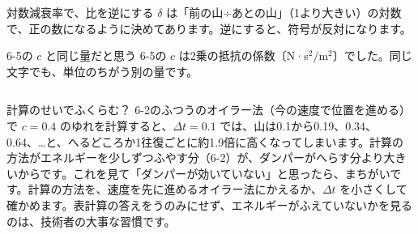 \begin{tsumazuki}{対数減衰率で、比を逆にする}
$\delta$ は「前の山÷あとの山」（1より大きい）の対数で、正の数になるように決めてあります。逆にすると、符号が反対になります。
\end{tsumazuki}

\begin{tsumazuki}{6-5の $c$ と同じ量だと思う}
6-5の $c$ は2乗の抵抗の係数〔N·s$^2$/m$^2$〕でした。同じ文字でも、単位のちがう別の量です。
\end{tsumazuki}



\begin{column}{計算のせいでふくらむ？}
6-2のふつうのオイラー法（今の速度で位置を進める）で $c=0.4$ のゆれを計算すると、$\Delta t=0.1$ では、山は0.1から0.19、0.34、0.64、…と、へるどころか1往復ごとに約1.9倍に高くなってしまいます。計算の方法がエネルギーを少しずつふやす分（6-2）が、ダンパーがへらす分より大きいからです。これを見て「ダンパーが効いていない」と思ったら、まちがいです。計算の方法を、速度を先に進めるオイラー法にかえるか、$\Delta t$ を小さくして確かめます。表計算の答えをうのみにせず、エネルギーがふえていないかを見るのは、技術者の大事な習慣です。
\end{column}

